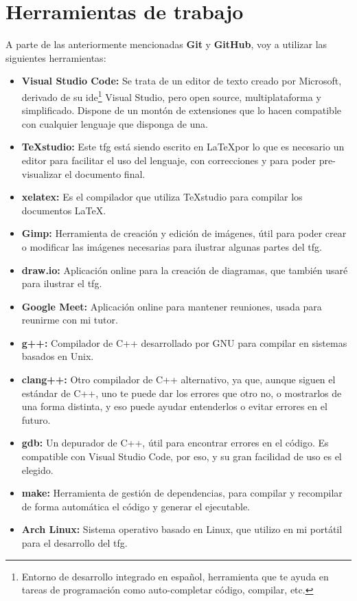 \section{Herramientas de trabajo}
\label{herramientas}
A parte de las anteriormente mencionadas \textbf{Git} y \textbf{GitHub}, voy a utilizar las siguientes herramientas:
\begin{itemize}
    \item \textbf{Visual Studio Code:} Se trata de un editor de texto creado por Microsoft, derivado de su \gls{ide}\footnote{Entorno de desarrollo integrado en español, herramienta que te ayuda en tareas de programación como auto-completar código, compilar, etc.} Visual Studio, pero open source, multiplataforma y simplificado. Dispone de un montón de extensiones que lo hacen compatible con cualquier lenguaje que disponga de una.
    \item \textbf{TeXstudio:} Este \gls{tfg} está siendo escrito en \LaTeX por lo que es necesario un editor para facilitar el uso del lenguaje, con correcciones y para poder pre-visualizar el documento final.
    \item \textbf{xelatex:} Es el compilador que utiliza TeXstudio para compilar los documentos \LaTeX.
    \item \textbf{Gimp:} Herramienta de creación y edición de imágenes, útil para poder crear o modificar las imágenes necesarias para ilustrar algunas partes del \gls{tfg}.
    \item \textbf{draw.io:} Aplicación online para la creación de diagramas, que también usaré para ilustrar el \gls{tfg}.
    \item \textbf{Google Meet:} Aplicación online para mantener reuniones, usada para reunirme con mi tutor.
    \item \textbf{g++:} Compilador de C++ desarrollado por GNU para compilar en sistemas basados en Unix.
    \item \textbf{clang++:} Otro compilador de C++ alternativo, ya que, aunque siguen el estándar de C++, uno te puede dar los errores que otro no, o mostrarlos de una forma distinta, y eso puede ayudar entenderlos o evitar errores en el futuro.
    \item \textbf{gdb:} Un depurador de C++, útil para encontrar errores en el código. Es compatible con Visual Studio Code, por eso, y su gran facilidad de uso es el elegido. 
    \item \textbf{make:} Herramienta de gestión de dependencias, para compilar y recompilar de forma automática el código y generar el ejecutable.
    \item \textbf{Arch Linux:} Sistema operativo basado en Linux, que utilizo en mi portátil para el desarrollo del \gls{tfg}.
\end{itemize}